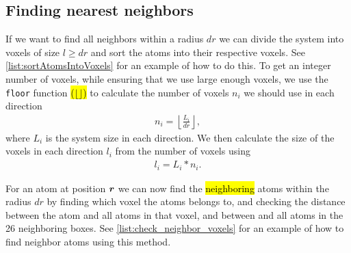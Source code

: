 \subsection{Finding nearest neighbors}
If we want to find all neighbors within a radius $dr$ we can divide the system into voxels of size $l \geq dr$ and sort the atoms into their respective voxels. See \cref{list:sortAtomsIntoVoxels} for an example of how to do this. To get an integer number of voxels, while ensuring that we use large enough voxels, we use the \Verb!floor! function \hl{($\lfloor \rfloor$)} to calculate the number of voxels $n_i$ we should use in each direction
\begin{align*}
    n_i = \left\lfloor \frac{L_i}{dr} \right\rfloor,
\end{align*}
where $L_i$ is the system size in each direction. We then calculate the size of the voxels in each direction $l_i$ from the number of voxels using
\begin{align*}
    l_i = L_i*n_i.
\end{align*}

For an atom at position $\boldsymbol{r}$ we can now find the \hl{neighboring} atoms within the radius $dr$ by finding which voxel the atoms belongs to, and checking the distance between the atom and all atoms in that voxel, and between and all atoms in the 26 neighboring boxes. See \cref{list:check_neighbor_voxels} for an example of how to find neighbor atoms using this method.




